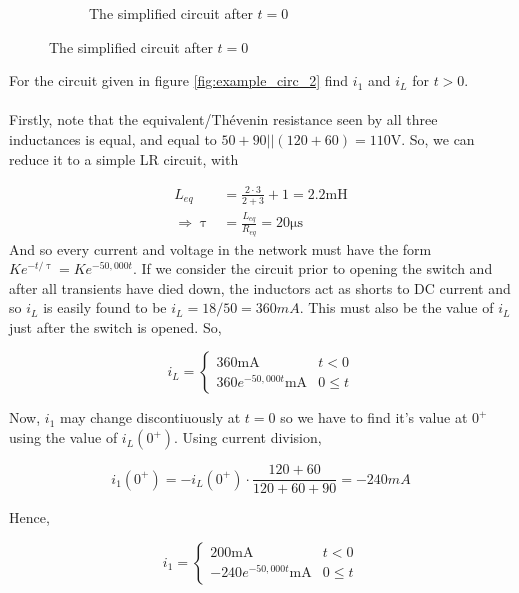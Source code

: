 \documentclass[11pt]{article}
\numberwithin{equation}{section}
\begin{document}
\begin{flushleft}
\begin{tcolorbox}[colback=RedOrange!5, colframe=RedOrange!75!black, title=\textbf{Example 2.2}, breakable]
\begin{figure}[H]
\begin{subfigure}{.5\textwidth}
  \caption{The simplified circuit after $t=0$}
  \label{fig:simplified_circ_2}
\end{subfigure}
\label{fig:example_2}
\end{figure}

For the circuit given in figure \ref{fig:example_circ_2} find $i_1$ and $i_L$ for 
$t>0$.\\~\\


Firstly, note that the equivalent/Th\'{e}venin resistance seen by all three inductances is equal, and equal
to $50 + 90||(120 + 60) =110\si{\volt}$. So, we can reduce it to a simple LR circuit, with

\begin{align*}
L_{eq} &= \frac{2 \cdot 3}{2+3} + 1 = 2.2 \si{\milli\henry}\\
\Rightarrow \uptau &= \frac{L_{eq}}{R_{eq}} = 20 \si{\micro\second} 
\end{align*}
And so every current and voltage in the network must have the form $Ke^{-t/\uptau}=Ke^{-50,000t}$.
If we consider the circuit prior to opening the switch and after all transients have died down, the
inductors act as shorts to DC current and so $i_L$ is easily found to be $i_L = 18/50 = 360mA$. This must
also be the value of $i_L$ just after the switch is opened. So,

\begin{equation*}
i_L = \begin{cases} 
          360 \si{\milli\ampere} & t < 0 \\
          360e^{-50,000t} \si{\milli\ampere} & 0\leq t 
       \end{cases}
\end{equation*}

Now, $i_1$ may change discontiuously at $t=0$ so we have to find it's value at $0^{+}$ using the value of
$i_L(0^+)$. Using current division,

\begin{equation*}
i_1(0^+) = -i_L(0^+) \cdot \frac{120+60}{120+60+90} = -240 mA
\end{equation*}

Hence,

\begin{equation*}
i_1 = \begin{cases} 
          200 \si{\milli\ampere} & t < 0 \\
          -240e^{-50,000t} \si{\milli\ampere} & 0\leq t 
       \end{cases}
\end{equation*}
\end{tcolorbox}


\end{flushleft}
\end{document}
